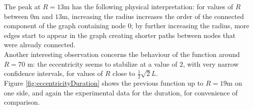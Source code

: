 The peak at $R=13$m has the following physical interpretation: for values of $R$
between $0$m and $13$m, increasing the radius increases the order of the
connected component of the graph containing node 0; by further increasing the
radius, more edges start to appear in the graph creating shorter paths between
nodes that were already connected.\\
Another interesting observation concerns the behaviour of the function around
$R = 70$ m: the eccentricity seems to stabilize at a value of $2$, with very
narrow confidence intervals, for values  of $R$ close to $\frac{1}{2}\sqrt{2}L$.\\
Figure \ref{fig:eccentricityDuration} shows the previous function up to $R = 19$m
on one side, and again the experimental data for the duration, for convenience
of comparison.\\
